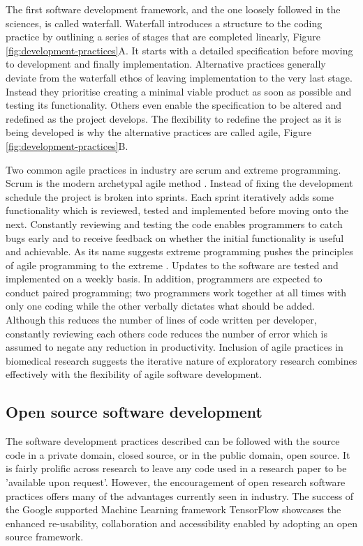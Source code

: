 \documentclass[../main.tex]{subfiles}
\begin{document}
The first software development framework, and the one loosely followed in the sciences, is called waterfall.
Waterfall introduces a structure to the coding practice by outlining a series of stages that are completed linearly, Figure \ref{fig:development-practices}A.
It starts with a detailed specification before moving to development and finally implementation.
Alternative practices generally deviate from the waterfall ethos of leaving implementation to the very last stage.
Instead they prioritise creating a minimal viable product as soon as possible and testing its functionality.
Others even enable the specification to be altered and redefined as the project develops.
The flexibility to redefine the project as it is being developed is why the alternative practices are called agile, Figure \ref{fig:development-practices}B. 

Two common agile practices in industry are scrum and extreme programming.
Scrum is the modern archetypal agile method \parencite{Schwaber2020}.
Instead of fixing the development schedule the project is broken into sprints.
Each sprint iteratively adds some functionality which is reviewed, tested and implemented before moving onto the next.
Constantly reviewing and testing the code enables programmers to catch bugs early and to receive feedback on whether the initial functionality is useful and achievable.
As its name suggests extreme programming pushes the principles of agile programming to the extreme \parencite{Beck2004}.
Updates to the software are tested and implemented on a weekly basis. 
In addition, programmers are expected to conduct paired programming; 
two programmers work together at all times with only one coding while the other verbally dictates what should be added. 
Although this reduces the number of lines of code written per developer, constantly reviewing each others code reduces the number of error which is assumed to negate any reduction in productivity.
Inclusion of agile practices in biomedical research suggests the iterative nature of exploratory research combines effectively with the flexibility of agile software development\parencite{kane2006}.

\subsection{Open source software development}

The software development practices described can be followed with the source code in a private domain, closed source, or in the public domain, open source. 
It is fairly prolific across research to leave any code used in a research paper to be 'available upon request'.
However, the encouragement of open research software practices offers many of the advantages currently seen in industry. 
The success of the Google supported Machine Learning framework TensorFlow showcases the enhanced re-usability, collaboration and accessibility enabled by adopting an open source framework. 
\end{document}
